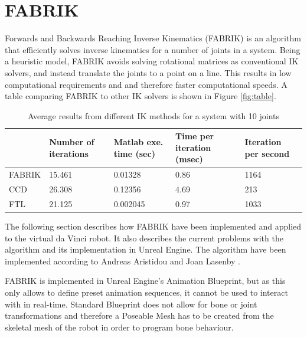 \section{FABRIK}

Forwards and Backwards Reaching Inverse Kinematics (FABRIK) is an algorithm that efficiently solves inverse kinematics for a number of joints in a system. Being a heuristic model, FABRIK avoids solving rotational matrices as conventional IK solvers, and instead translate the joints to a point on a line. This results in low computational requirements and and therefore faster computational speeds. A table comparing FABRIK to other IK solvers is shown in Figure \autoref{fig:table}. 

\begin{table}[H]
\centering
\label{fig:table}
\begin{tabular}{l|llll}
       & \textbf{Number of iterations} & \textbf{Matlab exe. time (sec)} & \textbf{Time per iteration (msec)} & \textbf{Iteration per second} \\ \hline
FABRIK & 15.461                        & 0.01328                         & 0.86                               & 1164                          \\
CCD    & 26.308                        & 0.12356                         & 4.69                               & 213                           \\
FTL    & 21.125                        & 0.002045                        & 0.97                               & 1033                          \\ \hline
\end{tabular}
\caption{Average results from different IK methods for a system with 10 joints}
\end{table}


The following section describes how FABRIK have been implemented and applied to the virtual da Vinci robot. It also describes the current problems with the algorithm and its implementation in Unreal Engine. 
The algorithm have been implemented according to Andreas Aristidou and Joan Lasenby \citep{FABRIK: A fast, iterative solver for the Inverse Kinematics problem}.  %

FABRIK is implemented in Unreal Engine's Animation Blueprint, but as this only allows to define preset animation sequences, it cannot be used to interact with in real-time. Standard Blueprint does not allow for bone or joint transformations and therefore a Poseable Mesh has to be created from the skeletal mesh of the robot in order to program bone behaviour. 

